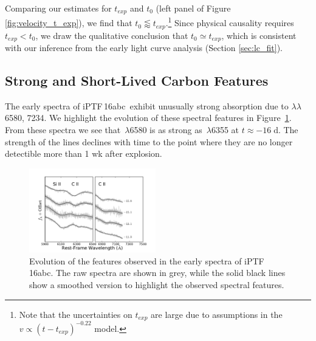 \documentclass[twocolumn]{aastex61}
\newcommand{\abc}{iPTF\,16abc}
\newcommand{\ycao}[1]{{\color{red} ycao: {#1}}}
\begin{document}
Comparing our estimates for $t_{exp}$ and $t_0$ (left panel of 
Figure \ref{fig:velocity_t_exp}), we find that 
$t_0\lessapprox t_{exp}$.\footnote{Note that the uncertainties on $t_{exp}$ are large due to assumptions in the $v\propto(t-t_{exp})^{-0.22}$ model.}
Since physical causality requires $t_{exp}<t_0$, we draw the qualitative
conclusion that $t_0\simeq t_{exp}$, which is consistent
with our inference from the early light curve analysis (Section
\ref{sec:lc_fit}).


\subsection{Strong and Short-Lived Carbon Features}
\label{sec:carbon}

The early spectra of \abc\ exhibit unusually strong absorption due 
to  $\lambda\lambda$6580, 7234. We highlight the evolution 
of these spectral features in Figure~\ref{fig:carbon}. From these 
spectra we see that \,$\lambda$6580 is as strong as 
\,$\lambda$6355 at $t \approx -16 \; \mathrm{d}$. The 
strength of the  lines declines with time to the point 
where they are no longer detectible more than 1 wk after explosion.

\begin{figure}[]
  \centering
  \includegraphics[width=0.49\textwidth]{CarbonFeature.pdf}
  \caption{Evolution of the  features observed in the 
  early spectra of \abc. The raw spectra are shown in grey, while 
  the solid black lines show a smoothed version to highlight the 
  observed spectral features.}
  \label{fig:carbon}
\end{figure}
\end{document}
